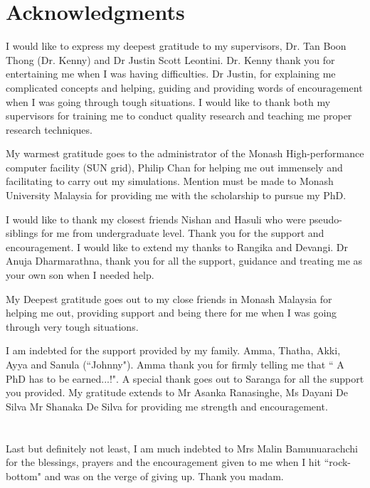 \chapter*{Acknowledgments}

I would like to express my deepest gratitude to my supervisors, Dr. Tan Boon Thong (Dr. Kenny) and Dr Justin Scott Leontini. Dr. Kenny thank you for entertaining me when I was having difficulties. Dr Justin, for explaining me complicated concepts and helping, guiding and providing words of encouragement when I was going through tough situations. I would like to thank both my supervisors for training me to conduct quality research and teaching me proper research techniques.

My warmest gratitude goes to the administrator of the Monash High-performance computer facility (SUN grid), Philip Chan for helping me out immensely and facilitating to carry out my simulations. Mention must be made to Monash University Malaysia for providing me with the scholarship to pursue my PhD. 
 
I would like to thank my closest friends Nishan and Hasuli who were pseudo-siblings for me from undergraduate level. Thank you for the support and encouragement. I would like to extend my thanks to Rangika and Devangi. Dr Anuja Dharmarathna, thank you for all the support, guidance and treating me as your own son when I needed help.

My Deepest gratitude goes out to my close friends in Monash Malaysia for helping me out, providing support and being there for me when I was going through very tough situations. 

I am indebted for the support provided by my family. Amma, Thatha, Akki, Ayya and Sanula (``Johnny"). Amma thank you for firmly telling me that `` A PhD has to be earned...!". A special thank goes out to Saranga for all the support you provided. My gratitude extends to Mr Asanka Ranasinghe, Ms Dayani De Silva Mr Shanaka De Silva for providing me strength and encouragement.
\\
\\
\\
Last but definitely not least, I am much indebted to Mrs Malin Bamunuarachchi for the blessings, prayers and the encouragement given to me when I hit ``rock-bottom"  and was on the verge of giving up. Thank you madam.    

 

  

  